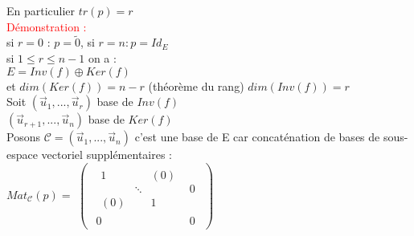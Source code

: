 \documentclass{article}
\begin{document}
				 En particulier $tr(p)=r$ \\
				 \textcolor{red}{Démonstration :} \\
				 si $r=0$ : $p= \tilde{0}$, si $r=n : p=Id_E$ \\
				 si $1 \leq r \leq n-1$ on a : \\
				 $E= Inv(f) \oplus Ker(f)$ \\
				 et $dim(Ker(f))=n-r$ (théorème du rang) $dim(Inv(f))=r$ \\
				 Soit $(\vec u_1,..., \vec u_r)$ base de $Inv(f)$ \\
				 $(\vec u_{r+1},..., \vec u_{n})$ base de $Ker(f)$ \\
				 Posons $\mathcal C =(\vec u_1,..., \vec u_n)$ c'est une base de E car concaténation de bases de sous-espace vectoriel supplémentaires : \\
				 $Mat_{\mathcal C}(p)=$ $\begin{pmatrix}\begin{array}{c|c}\begin{matrix}
				 1 &  & (0) \\  & \ddots & \\ (0) & & 1
				 \end{matrix} & 0 \\ \hline0 & 0 \end{array}\end{pmatrix}$
\end{document}
